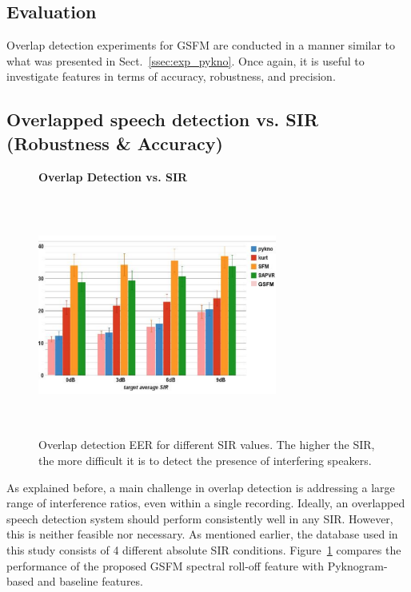 {\subsection{Evaluation}
\label{ssec:exp_gsfm}
Overlap detection experiments for GSFM are conducted in a manner similar to what was presented in Sect.~\ref{ssec:exp_pykno}. 
Once again, it is useful to investigate features in terms of accuracy, robustness, and precision. 

\vspace{3mm}
\subsection{Overlapped speech detection vs. SIR (Robustness \& Accuracy)}
\label{sssec:ovl_frame_vs_sir_gsfm}
\begin{figure}[b!]
	\centering
	\hspace{-1mm}
	\textbf{Overlap Detection vs. SIR}\par\medskip
	\includegraphics[height = 3.1in, width=0.7\textwidth]{figures/ovl_det_vs_sir_gsfm}
	\vspace{-1mm}
	\caption{ Overlap detection EER for different SIR values. The higher the SIR, the more difficult it is to detect the presence of interfering speakers.}
	\vspace{0mm}
	\label{fig:ch2_ovl_det_gsfm}
\end{figure}

As explained before, a main challenge in overlap detection is addressing a large range of interference ratios, even within a single recording. 
Ideally, an overlapped speech detection system should perform consistently well in any SIR. 
However, this is neither feasible nor necessary. 
As mentioned earlier, the database used in this study consists of 4 different absolute SIR conditions. 
Figure~\ref{fig:ch2_ovl_det_gsfm} compares the performance of the proposed GSFM spectral roll-off feature with Pyknogram-based and baseline features.

}
